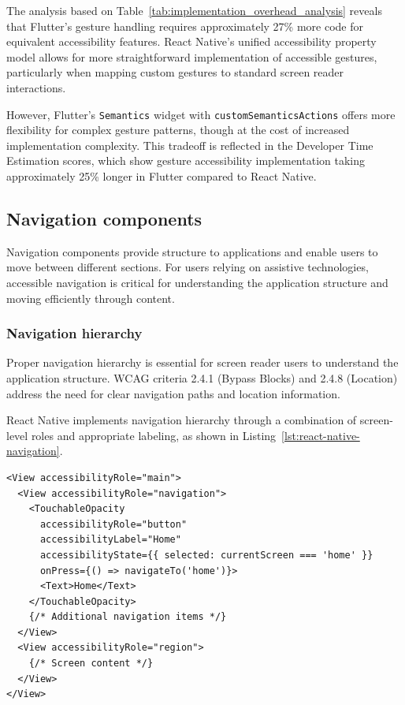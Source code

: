 The analysis based on Table~\ref{tab:implementation_overhead_analysis} reveals that Flutter's gesture handling requires approximately 27\% more code for equivalent accessibility features. React Native's unified accessibility property model allows for more straightforward implementation of accessible gestures, particularly when mapping custom gestures to standard screen reader interactions.

However, Flutter's \texttt{Semantics} widget with \texttt{customSemanticsActions} offers more flexibility for complex gesture patterns, though at the cost of increased implementation complexity. This tradeoff is reflected in the Developer Time Estimation scores, which show gesture accessibility implementation taking approximately 25\% longer in Flutter compared to React Native.

\subsection{Navigation components}
\label{subsec:navigation-components}

Navigation components provide structure to applications and enable users to move between different sections. For users relying on assistive technologies, accessible navigation is critical for understanding the application structure and moving efficiently through content.

\subsubsection{Navigation hierarchy}
\label{subsubsec:navigation-hierarchy}

Proper navigation hierarchy is essential for screen reader users to understand the application structure. WCAG criteria 2.4.1 (Bypass Blocks) and 2.4.8 (Location) address the need for clear navigation paths and location information.

React Native implements navigation hierarchy through a combination of screen-level roles and appropriate labeling, as shown in Listing~\ref{lst:react-native-navigation}.

\begin{lstlisting}[style=ReactNativeStyle, caption=Navigation hierarchy in React Native, label=lst:react-native-navigation]
<View accessibilityRole="main">
  <View accessibilityRole="navigation">
    <TouchableOpacity
      accessibilityRole="button"
      accessibilityLabel="Home"
      accessibilityState={{ selected: currentScreen === 'home' }}
      onPress={() => navigateTo('home')}>
      <Text>Home</Text>
    </TouchableOpacity>
    {/* Additional navigation items */}
  </View>
  <View accessibilityRole="region">
    {/* Screen content */}
  </View>
</View>
\end{lstlisting}

